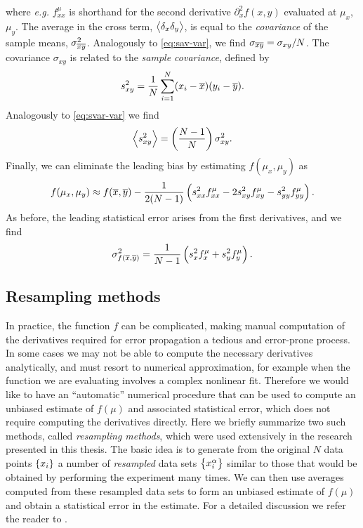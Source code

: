 where \textit{e.g.} $f_{x x}^{\mu}$ is shorthand for the second derivative
$\partial_x^2 f(x,y)$ evaluated at $\mu_x$, $\mu_y$. The average in the cross
term, $\left< \delta_x \delta_y \right>$, is equal to the \emph{covariance} of the sample
means, $\sigma_{\overline{x} \overline{y}}^2$. Analogously to \cref{eq:sav-var}, we find
$\sigma_{\overline{x} \overline{y}}=\sigma_{x y}/N$. The covariance $\sigma_{x y}$ is
related to the \emph{sample covariance}, defined by
\begin{equation}
  s^2_{x y} = \frac{1}{N}\sum_{i=1}^N (x_i - \overline{x})(y_i - \overline{y}).
\end{equation}
Analogously to \cref{eq:svar-var} we find
\begin{equation}
  \left< s^2_{x y} \right> = \left(\frac{N-1}{N}\right) \sigma^2_{x y}.
\end{equation}
Finally, we can eliminate the leading bias by estimating $f(\mu_x,\mu_y)$ as
\begin{equation}
  f(\mu_x,\mu_y) \approx
  f(\overline{x},\overline{y}) - \frac{1}{2(N-1)}\left(
  s^2_{x x} f_{x x}^{\mu} -
  2 s^2_{x y} f_{x y}^{\mu} -
  s^2_{y y} f_{y y}^{\mu}
  \right).
\end{equation}
As before, the leading statistical error arises from the first derivatives,
and we find
\begin{equation}
  \sigma_{f(\overline{x},\overline{y})}^2 =
  \frac{1}{N-1}\left(s_x^2 f_x^{\mu} + s_y^2 f_y^{\mu}\right).
\end{equation}


\subsection{Resampling methods}
\label{sec:numerical-resampling}

In practice, the function $f$ can be complicated, making manual computation of
the derivatives required for error propagation a tedious and error-prone
process. In some cases we may not be able to compute the necessary derivatives
analytically, and must resort to numerical approximation, for example when the
function we are evaluating involves a complex nonlinear fit. Therefore we would
like to have an ``automatic'' numerical procedure that can be used to compute
an unbiased estimate of $f(\mu)$ and associated statistical error, which does
not require computing the derivatives directly. Here we briefly summarize two
such methods, called \emph{resampling methods}, which were used extensively in
the research presented in this thesis. The basic idea is to generate from the
original $N$ data points $\cbr{x_i}$ a number of \emph{resampled} data sets
$\cbr{x_i^{\alpha}}$ similar to those that would be obtained by performing the
experiment many times. We can then use averages computed from these resampled
data sets to form an unbiased estimate of $f(\mu)$ and obtain a statistical
error in the estimate. For a detailed discussion we refer the reader to
\textcite{young2015everything}.


